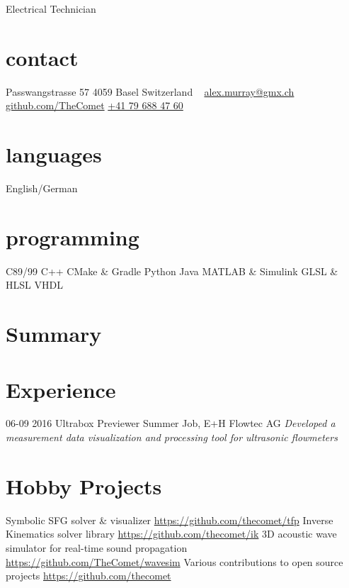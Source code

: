 \documentclass[]{friggeri-cv}
\begin{document}
       {Electrical Technician}


\begin{aside}
  \section{contact}
    Passwangstrasse 57
    4059 Basel
    Switzerland
    ~
    \href{mailto:alex.murray@gmx.ch}{alex.murray@gmx.ch}
    \href{https://github.com/TheComet}{github.com/TheComet}
    \href{tel:41796884760}{+41 79 688 47 60}
  \section{languages}
    English/German
  \section{programming}
    C89/99
    C++ 
    CMake \& Gradle
    Python
    Java
    MATLAB \& Simulink
    GLSL \& HLSL
    VHDL
\end{aside}

\section{Summary}

\section{Experience}

\begin{entrylist}
  \entry
    {06-09 2016}
    {Ultrabox Previewer}
    {Summer Job, E+H Flowtec AG}
    {\emph{Developed a measurement data visualization and processing tool for ultrasonic flowmeters}}
\end{entrylist}

\section{Hobby Projects}

\begin{entrylist}
  \entry
    {}
    {Symbolic SFG solver \& visualizer}
    {}
    {\url{https://github.com/thecomet/tfp}}
  \entry
    {}
    {Inverse Kinematics solver library}
    {}
    {\url{https://github.com/thecomet/ik}}
  \entry
    {}
    {3D acoustic wave simulator for real-time sound propagation}
    {}
    {\url{https://github.com/TheComet/wavesim}}
  \entry
    {}
    {Various contributions to open source projects}
    {}
    {\url{https://github.com/thecomet}}
\end{entrylist}
\end{document}
